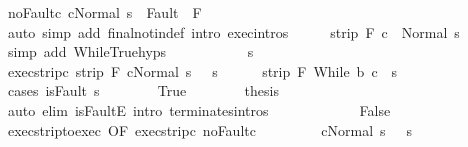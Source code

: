 \begin{isabellebody}
\ noFault{\isacharunderscore}c{\isacharcolon}\ {\isachardoublequoteopen}{\isasymGamma}{\isasymturnstile}{\isasymlangle}c{\isacharcomma}Normal\ s\ {\isasymrangle}\ {\isasymRightarrow}{\isasymnotin}Fault\ {\isacharbackquote}\ F{\isachardoublequoteclose}\isanewline
\ \ \ \ \isamarkupfalse%
\ {\isacharparenleft}auto\ simp\ add{\isacharcolon}\ final{\isacharunderscore}notin{\isacharunderscore}def\ intro{\isacharcolon}\ exec{\isachardot}intros{\isacharparenright}\isanewline
\ \ \isamarkupfalse%
\ \isamarkupfalse%
\ {\isachardoublequoteopen}strip\ F\ {\isasymGamma}{\isasymturnstile}c\ {\isasymdown}\ Normal\ s{\isachardoublequoteclose}\ \isamarkupfalse%
\ {\isacharparenleft}simp\ add{\isacharcolon}\ WhileTrue{\isachardot}hyps{\isacharparenright}\isanewline
\ \ \isamarkupfalse%
\isanewline
\ \ \isacommand{{\isacharbraceleft}}\isamarkupfalse%
\isanewline
\ \ \ \ \isamarkupfalse%
\ s{\isacharprime}\isanewline
\ \ \ \ \isamarkupfalse%
\ exec{\isacharunderscore}strip{\isacharunderscore}c{\isacharcolon}\ {\isachardoublequoteopen}strip\ F\ {\isasymGamma}{\isasymturnstile}{\isasymlangle}c{\isacharcomma}Normal\ s\ {\isasymrangle}\ {\isasymRightarrow}\ s{\isacharprime}{\isachardoublequoteclose}\isanewline
\ \ \ \ \isamarkupfalse%
\ {\isachardoublequoteopen}strip\ F\ {\isasymGamma}{\isasymturnstile}While\ b\ c\ {\isasymdown}\ s{\isacharprime}{\isachardoublequoteclose}\isanewline
\ \ \ \ \isamarkupfalse%
\ {\isacharparenleft}cases\ {\isachardoublequoteopen}isFault\ s{\isacharprime}{\isachardoublequoteclose}{\isacharparenright}\isanewline
\ \ \ \ \ \ \isamarkupfalse%
\ True\isanewline
\ \ \ \ \ \ \isamarkupfalse%
\ {\isacharquery}thesis\ \isamarkupfalse%
\ {\isacharparenleft}auto\ elim{\isacharcolon}\ isFaultE\ intro{\isacharcolon}\ terminates{\isachardot}intros{\isacharparenright}\isanewline
\ \ \ \ \isamarkupfalse%
\isanewline
\ \ \ \ \ \ \isamarkupfalse%
\ False\isanewline
\ \ \ \ \ \ \isamarkupfalse%
\ exec{\isacharunderscore}strip{\isacharunderscore}to{\isacharunderscore}exec\ {\isacharbrackleft}OF\ exec{\isacharunderscore}strip{\isacharunderscore}c{\isacharbrackright}\ noFault{\isacharunderscore}c\isanewline
\ \ \ \ \ \ \isamarkupfalse%
\ {\isacharasterisk}{\isacharcolon}\ {\isachardoublequoteopen}{\isasymGamma}{\isasymturnstile}{\isasymlangle}c{\isacharcomma}Normal\ s\ {\isasymrangle}\ {\isasymRightarrow}\ s{\isacharprime}{\isachardoublequoteclose}\isanewline

\end{isabellebody}
